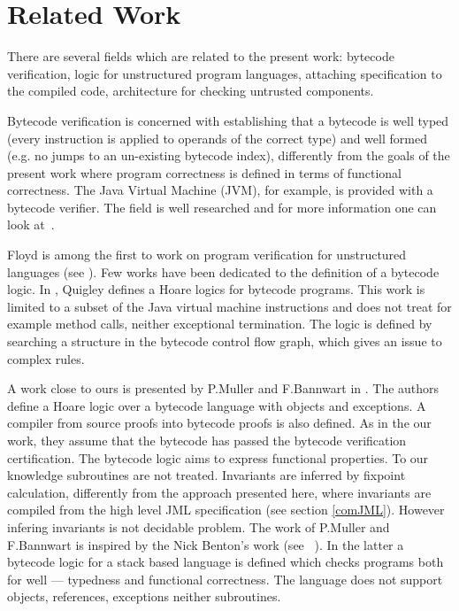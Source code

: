 \section{Related Work} \label{relWork}
    
There are several fields which are related to the present work: bytecode verification, logic for unstructured program languages, attaching specification to the compiled code, architecture for checking untrusted components.

 Bytecode verification is concerned with establishing that a bytecode is well typed 
(every instruction is applied to operands of the correct type) and well formed 
(e.g. no jumps to an un-existing bytecode index), differently from the goals of the present
work where program correctness is defined in terms of functional correctness. The Java Virtual Machine (JVM), for example, is provided with a bytecode verifier. 
The field is well researched and for more information one can look at~\cite{Ljbc}.  

Floyd is among the first to work on program verification for unstructured languages (see \cite{F67amp}).
Few works have been dedicated to the definition of a bytecode logic. In \cite{Quigley}, Quigley defines a Hoare logics for bytecode programs. 
 This work is limited to a subset of the Java virtual machine instructions and does not treat for example method calls, 
 neither exceptional termination. The logic is defined by searching a structure in the bytecode control flow graph, 
 which gives an issue to complex rules.

A work close to ours is presented by P.Muller and F.Bannwart in \cite{BM05plb}. The authors define a Hoare logic over a 
bytecode language with objects and  exceptions. A compiler from source proofs into bytecode proofs is also defined. 
As in the our work, they assume that the bytecode has passed the bytecode verification certification. The bytecode logic aims to 
express functional properties. To our knowledge subroutines are not treated. Invariants are inferred by fixpoint calculation, differently 
from the approach presented here, where invariants are compiled from the high level JML specification (see section \ref{comJML}). 
However infering invariants is not decidable problem. The work of P.Muller and F.Bannwart is inspired by the Nick Benton's work (see ~\cite{B04tlsj}). 
In the latter a bytecode logic for a stack based language is defined which checks programs both for well --- typedness and functional correctness. 
 The language does not support objects, references, exceptions neither subroutines. 

